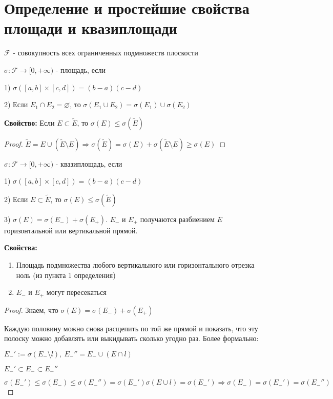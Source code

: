 \section{Определение и простейшие свойства площади и квазиплощади \href{https://youtu.be/p9C57KDo1Yg?t=6438}{\Walley}}

$\mathcal{F}$ - совокупность всех ограниченных подмножеств плоскости

\begin{conj}
    $\sigma: \mathcal{F} \to [0, +\infty)$ - площадь, если

    1) $\sigma([a, b]\times[c, d]) = (b-a)(c-d)$

    2) Если $E_1\cap E_2 = \varnothing$, то $\sigma(E_1 \cup E_2) = \sigma(E_1) \cup \sigma(E_2)$
\end{conj}

\textbf{Свойство:} Если $E \subset \widetilde{E}$, то
$\sigma(E) \leqslant \sigma(\widetilde{E})$

\begin{proof}
    $\widetilde{E} = E \cup (\widetilde{E} \setminus E) \Rightarrow
    \sigma(\widetilde{E}) = \sigma(E) + \sigma(\widetilde{E} \setminus E) \geqslant \sigma(E)$
\end{proof}

\begin{conj}
    $\sigma: \mathcal{F} \to [0, +\infty)$ - квазиплощадь, если

    1) $\sigma([a, b]\times[c, d]) = (b-a)(c-d)$

    2) Если $E \subset \widetilde{E}$, то $\sigma(E) \leqslant \sigma(\widetilde{E})$

    3) $\sigma(E) = \sigma(E_{-}) + \sigma(E_{+})$. $E_{-}$ и $E_{+}$ получаются
    разбиением $E$ горизонтальной или вертикальной прямой.
\end{conj}

\textbf{Свойства:}
\begin{enumerate}
    \item Площадь подмножества любого вертикального или горизонтального отрезка ноль (из пункта 1 определения)
    \item $E_{-}$ и $E_{+}$ могут пересекаться 
\end{enumerate}

\begin{proof}
    Знаем, что $\sigma(E) = \sigma(E_-) + \sigma(E_+)$

    Каждую половину можно снова расщепить по той же прямой и показать, что эту полоску 
    можно добавлять или выкидывать сколько угодно раз.
    Более формально:

    $E_-' := \sigma(E_- \setminus l),\ 
    E_-'' = E_- \cup (E \cap l)$

    $E_-' \subset E_- \subset E_-''$

    \[\sigma(E_-') \leqslant \sigma(E_-) \leqslant \sigma(E_-'') = \sigma(E_-') \sigma(E \cup l) = \sigma(E_-') \Rightarrow
    \sigma(E_-) = \sigma(E_-') = \sigma(E_-'')\]
\end{proof}
